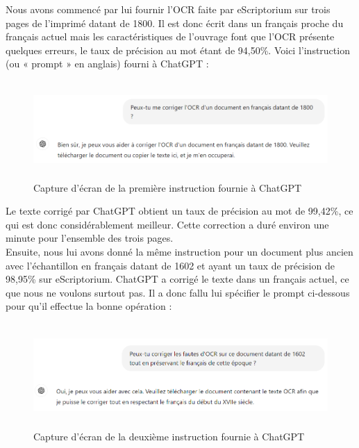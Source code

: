 \documentclass[a4paper,12pt,twoside]{book}
\begin{document}
Nous avons commencé par lui fournir l'OCR faite par eScriptorium sur
trois pages de l'imprimé datant de 1800. Il est donc écrit dans un
français proche du français actuel mais les caractéristiques de
l'ouvrage font que l'OCR présente quelques erreurs, le taux de précision
au mot étant de 94,50\%. Voici l'instruction (ou « prompt » en anglais) fourni à
ChatGPT : \\

\begin{figure} [H]
	\includegraphics[width=6.26806in,height=1.45833in]{vertopal_157ae480aa4a4b07be198b586a812241/media/image16.png}
	\caption{Capture d'écran de la première instruction fournie à ChatGPT}
\end{figure}


Le texte corrigé par ChatGPT obtient un taux de précision au mot de
99,42\%, ce qui est donc considérablement meilleur. Cette correction a
duré environ une minute pour l'ensemble des trois pages. \\

Ensuite, nous lui avons donné la même instruction pour un document plus
ancien avec l'échantillon en français datant de 1602 et ayant un taux de
précision de 98,95\% sur eScriptorium. ChatGPT a corrigé le texte dans
un français actuel, ce que nous ne voulons surtout pas. Il a donc fallu lui
spécifier le prompt ci-dessous pour qu'il effectue la bonne opération : \\

\begin{figure} [H]
	\includegraphics[width=6.26806in,height=1.55556in]{vertopal_157ae480aa4a4b07be198b586a812241/media/image17.png}
	\caption{Capture d'écran de la deuxième instruction fournie à ChatGPT}
\end{figure}
\end{document}
